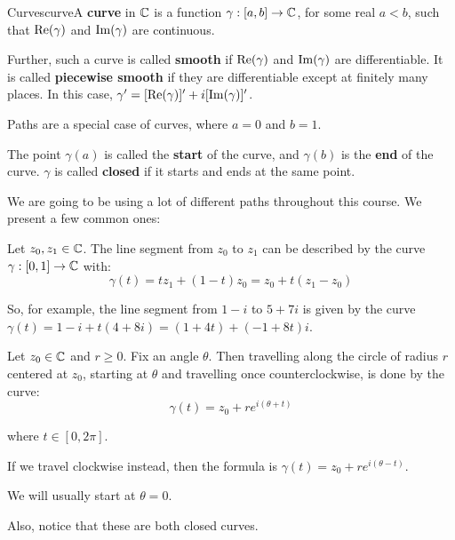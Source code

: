 \begin{defbo}{Curves}{curve}A {\bf curve} in $\mathbb{C}$ is a function $\gamma:[a,b] \rightarrow \mathbb{C}$, for some real $a < b$, such that $\operatorname{Re}(\gamma)$ and $\operatorname{Im}(\gamma)$ are continuous.

\vspace{5pt}

Further, such a curve is called {\bf smooth} if $\operatorname{Re}(\gamma)$ and $\operatorname{Im}(\gamma)$ are differentiable. It is called {\bf piecewise smooth} if they are differentiable except at finitely many places. In this case, $\gamma' = [\operatorname{Re}(\gamma)]' + i[\operatorname{Im}(\gamma)]'$.

\vspace{5pt}

Paths are a special case of curves, where $a = 0$ and $b = 1$.

\vspace{5pt}

The point $\gamma(a)$ is called the {\bf start} of the curve, and $\gamma(b)$ is the {\bf end} of the curve. $\gamma$ is called {\bf closed} if it starts and ends at the same point.
\end{defbo}

We are going to be using a lot of different paths throughout this course. We present a few common ones:

\begin{ex}{}{} Let $z_0,z_1\in \mathbb{C}$. The line segment from $z_0$ to $z_1$ can be described by the curve $\gamma:[0,1]\rightarrow \mathbb{C}$ with:
$$\gamma(t) = tz_1 + (1-t)z_0 = z_0 + t(z_1 - z_0)$$

So, for example, the line segment from $1 - i$ to $5 + 7i$ is given by the curve $\gamma(t) = 1 - i + t(4 + 8i) = (1+4t) + (-1 + 8t)i$.
\end{ex}

\begin{ex}{}{} Let $z_0 \in \mathbb{C}$ and $r\ge 0$. Fix an angle $\theta$. Then travelling along the circle of radius $r$ centered at $z_0$, starting at $\theta$ and travelling once counterclockwise, is done by the curve:
$$\gamma(t) = z_0 + re^{i(\theta + t)}$$

\noin where $t\in [0,2\pi]$.

If we travel clockwise instead, then the formula is $\gamma(t) = z_0 + re^{i(\theta - t)}$.

We will usually start at $\theta= 0$.

Also, notice that these are both closed curves.
\end{ex}

